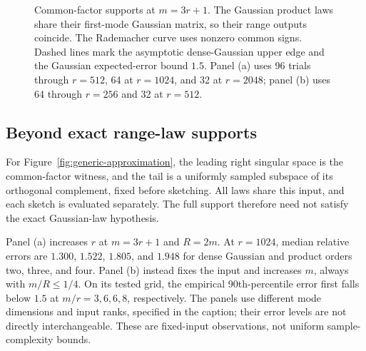 \documentclass[11pt,a4paper]{article}
\theoremstyle{definition}\newtheorem{definition}[theorem]{Definition}
\theoremstyle{remark}\newtheorem{remark}[theorem]{Remark}
\numberwithin{equation}{section}
\begin{document}
\begin{figure}[htbp]
\endgroup
\caption{Common-factor supports at $m=3r+1$.
The Gaussian product laws share their first-mode Gaussian matrix, so their
range outputs coincide. The Rademacher curve uses nonzero common signs.
Dashed lines mark the asymptotic dense-Gaussian upper edge
\cite{YBK1988} and the Gaussian expected-error bound $1.5$.
Panel (a) uses 96 trials through $r=512$, 64 at $r=1024$, and 32 at
$r=2048$; panel (b) uses 64 through $r=256$ and 32 at $r=512$.}
\label{fig:kr-separation-numerics}
\end{figure}

\subsection{Beyond exact range-law supports}
For Figure~\ref{fig:generic-approximation}, the leading right singular
space is the common-factor witness, and the tail is a uniformly sampled
subspace of its orthogonal complement, fixed before sketching.
All laws share this input, and each sketch is evaluated separately.
The full support therefore need not satisfy the exact Gaussian-law
hypothesis.

Panel (a) increases $r$ at $m=3r+1$ and $R=2m$.
At $r=1024$, median relative errors are $1.300$, $1.522$, $1.805$,
and $1.948$ for dense Gaussian and product orders two, three, and four.
Panel (b) instead fixes the input and increases $m$, always with
$m/R\le1/4$. On its tested grid, the empirical 90th-percentile error
first falls below $1.5$ at $m/r=3,6,6,8$, respectively.
The panels use different mode dimensions and input ranks, specified in
the caption; their error levels are not directly interchangeable.
These are fixed-input observations, not uniform sample-complexity bounds.
\end{document}
